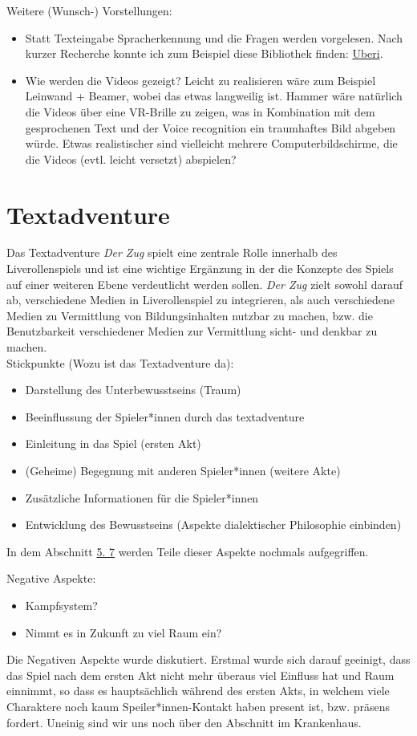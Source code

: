 \documentclass[12pt, a4paper, openany]{report}
\begin{document}
Weitere (Wunsch-) Vorstellungen:
\begin{itemize}
\item Statt Texteingabe Spracherkennung und die Fragen werden vorgelesen.
    Nach kurzer Recherche konnte ich zum Beispiel diese Bibliothek finden: \href{https://github.com/Uberi/speech_recognition}{Uberi}. 
\item Wie werden die Videos gezeigt? 
    Leicht zu realisieren wäre zum Beispiel Leinwand + Beamer, wobei das etwas langweilig ist. 
    Hammer wäre natürlich die Videos über eine VR-Brille zu zeigen, was in Kombination mit dem gesprochenen Text und der Voice recognition ein \glqq traumhaftes\grqq{} Bild abgeben würde.
    Etwas realistischer sind vielleicht mehrere Computerbildschirme, die die Videos (evtl. leicht versetzt) abspielen? 
\end{itemize}

\chapter{Textadventure} \label{textadventure} 
Das Textadventure \textit{Der Zug} spielt eine zentrale Rolle innerhalb des Liverollenspiels und ist eine wichtige Ergänzung in der die Konzepte des Spiels auf einer weiteren Ebene verdeutlicht werden sollen. 
\textit{Der Zug} zielt sowohl darauf ab, verschiedene Medien in Liverollenspiel zu integrieren, als auch verschiedene Medien zu Vermittlung von Bildungsinhalten nutzbar zu machen, bzw. die Benutzbarkeit verschiedener Medien zur Vermittlung sicht- und denkbar zu machen.\\
Stickpunkte (Wozu ist das Textadventure da):
\begin{itemize}
\item Darstellung des Unterbewusstseins (Traum)
\item Beeinflussung der Spieler*innen durch das textadventure
\item Einleitung in das Spiel (ersten Akt)
\item (Geheime) Begegnung mit anderen Spieler*innen (weitere Akte)
\item Zusätzliche Informationen für die Spieler*innen
\item Entwicklung des Bewusstseins (Aspekte dialektischer Philosophie einbinden)
\end{itemize}
In dem Abschnitt \hyperref[txtad-anlehnung]{5. 7} werden Teile dieser Aspekte nochmals aufgegriffen.

Negative Aspekte:
\begin{itemize}
\item Kampfsystem?
\item Nimmt es in Zukunft zu viel Raum ein? 
\end{itemize}
Die Negativen Aspekte wurde diskutiert.
Erstmal wurde sich darauf geeinigt, dass das Spiel nach dem ersten Akt nicht mehr überaus viel Einfluss hat und Raum einnimmt, so dass es hauptsächlich während des ersten Akts, in welchem viele Charaktere noch kaum Speiler*innen-Kontakt haben present ist, bzw. präsens fordert.
Uneinig sind wir uns noch über den Abschnitt im Krankenhaus.\\
\end{document}
